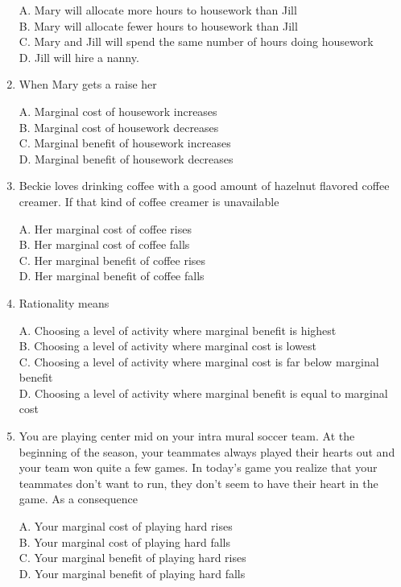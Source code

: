 \documentclass[
]{book}
\begin{document}
\begin{enumerate}
  A. Mary will allocate more hours to housework than Jill\\
  B. Mary will allocate fewer hours to housework than Jill\\
  C. Mary and Jill will spend the same number of hours doing housework\\
  D. Jill will hire a nanny.
\item
  When Mary gets a raise her

  A. Marginal cost of housework increases\\
  B. Marginal cost of housework decreases\\
  C. Marginal benefit of housework increases\\
  D. Marginal benefit of housework decreases
\item
  Beckie loves drinking coffee with a good amount of hazelnut flavored coffee creamer. If that kind of coffee creamer is unavailable

  A. Her marginal cost of coffee rises\\
  B. Her marginal cost of coffee falls\\
  C. Her marginal benefit of coffee rises\\
  D. Her marginal benefit of coffee falls
\item
  Rationality means

  A. Choosing a level of activity where marginal benefit is highest\\
  B. Choosing a level of activity where marginal cost is lowest\\
  C. Choosing a level of activity where marginal cost is far below marginal benefit\\
  D. Choosing a level of activity where marginal benefit is equal to marginal cost
\item
  You are playing center mid on your intra mural soccer team. At the beginning of the season, your teammates always played their hearts out and your team won quite a few games. In today's game you realize that your teammates don't want to run, they don't seem to have their heart in the game. As a consequence

  A. Your marginal cost of playing hard rises\\
  B. Your marginal cost of playing hard falls\\
  C. Your marginal benefit of playing hard rises\\
  D. Your marginal benefit of playing hard falls
\end{enumerate}
\end{document}
